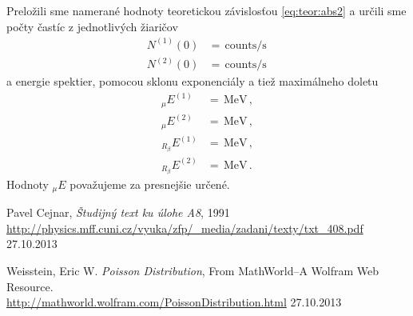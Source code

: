 \documentclass[a4paper, 10pt]{article}
\newcommand{\unit}[1]{\ensuremath{\, \mathrm{#1}}}
\begin{document}
Preložili sme namerané hodnoty teoretickou závislosťou \ref{eq:teor:abs2} a určili sme počty častíc z jednotlivých žiaričov
\begin{align*}
N^{(1)}(0) &=  \unit{counts/s}\,\\
N^{(2)}(0) &=  \unit{counts/s}
\end{align*}
a energie spektier, pomocou sklonu exponenciály a tiež maximálneho doletu
\begin{align*}
_\mu E^{(1)} &=  \unit{MeV}\,,\\
_\mu E^{(2)} &=  \unit{MeV}\,,\\
_{R_\beta} E^{(1)} &=  \unit{MeV}\,,\\
_{R_\beta} E^{(2)} &=  \unit{MeV}\,.
\end{align*}
Hodnoty $_\mu E$ považujeme za presnejšie určené.
\begin{thebibliography}{9}

    Pavel Cejnar, \emph{Študijný text ku úlohe A8}, 1991 \\
    \url{http://physics.mff.cuni.cz/vyuka/zfp/_media/zadani/texty/txt_408.pdf} 27.10.2013

    Weisstein, Eric W. \emph{Poisson Distribution}, From MathWorld--A Wolfram Web Resource.\\ \url{http://mathworld.wolfram.com/PoissonDistribution.html} 27.10.2013
\end{thebibliography}
\end{document}
